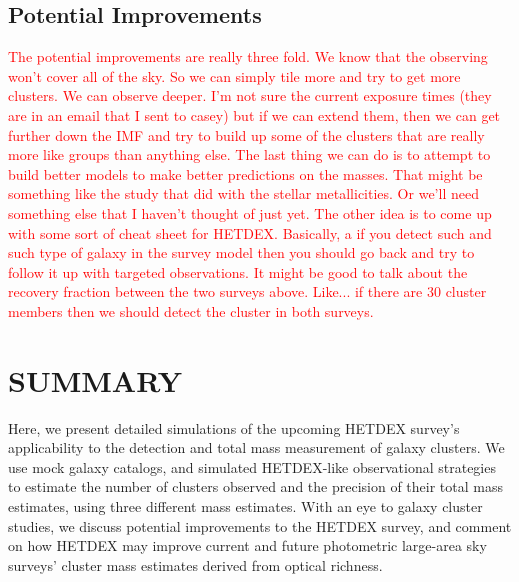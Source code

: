 \documentclass[fleqn,usenatbib]{mnras}
\newcommand{\editorial}[1]{\textcolor{red}{#1}}
\begin{document}
	

\subsection{Potential Improvements}
\editorial{The potential improvements are really three fold. We know that the observing won't cover all of the sky. So we can simply tile more and try to get more clusters. We can observe deeper. I'm not sure the current exposure times (they are in an email that I sent to casey) but if we can extend them, then we can get further down the IMF and try to build up some of the clusters that are really more like groups than anything else. The last thing we can do is to attempt to build better models to make better predictions on the masses. That might be something like the study that \cite{Acquaviva2016} did with the stellar metallicities. Or we'll need something else that I haven't thought of just yet. The other idea is to come up with some sort of cheat sheet for HETDEX. Basically, a if you detect such and such type of galaxy in the survey model then you should go back and try to follow it up with targeted observations. It might be good to talk about the recovery fraction between the two surveys above. Like... if there are 30 cluster members then we should detect the cluster in both surveys.}

\section{SUMMARY}\label{sec:summary}
Here, we present detailed simulations of the upcoming HETDEX survey's applicability to the detection and total mass measurement of galaxy clusters. We use mock galaxy catalogs, and simulated HETDEX-like observational strategies to estimate the number of clusters observed and the precision of their total mass estimates, using three different mass estimates. With an eye to galaxy cluster studies, we discuss potential improvements to the HETDEX survey, and comment on how HETDEX may improve current and future photometric large-area sky surveys' cluster mass estimates derived from optical richness.
\end{document}
